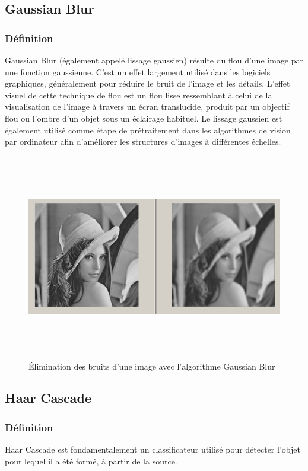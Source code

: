 \documentclass[12pt]{article}
\begin{document}
\subsection*{Gaussian Blur}
\subsubsection*{Définition}
Gaussian Blur (également appelé lissage gaussien) résulte du flou d'une image par une fonction gaussienne. C'est un effet largement utilisé dans les logiciels graphiques, généralement pour réduire le bruit de l'image et les détails. L’effet visuel de cette technique de flou est un flou lisse ressemblant à celui de la visualisation de l’image à travers un écran translucide, produit par un objectif flou ou l’ombre d’un objet sous un éclairage habituel. Le lissage gaussien est également utilisé comme étape de prétraitement dans les algorithmes de vision par ordinateur afin d'améliorer les structures d'images à différentes échelles.
\begin{figure}[h]
	\centering
	\includegraphics[height=9cm,width=15cm]{img-Chapiter-3/Blure.png}
	\caption{Élimination des bruits d'une image avec l'algorithme Gaussian Blur}
\end{figure}
\newpage
\subsection*{Haar Cascade}
\subsubsection*{Définition}
Haar Cascade est fondamentalement un classificateur utilisé pour détecter l'objet pour lequel il a été formé, à partir de la source.
\end{document}
